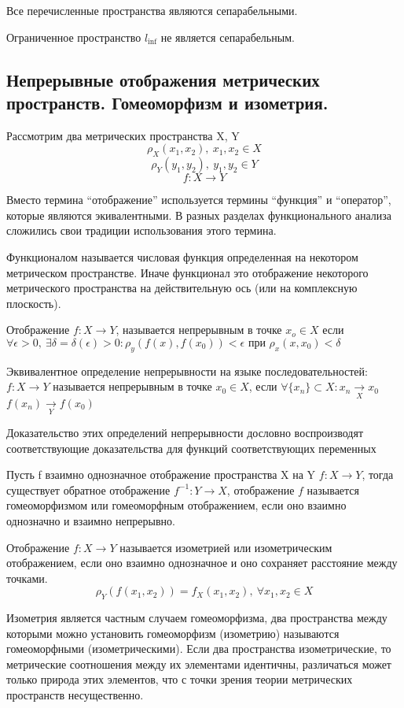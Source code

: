 \documentclass[14pt,a4paper]{extarticle}
\theoremstyle{definition}
\theoremstyle{remark}
\newcommand{\sep}{ , \ \allowbreak }
\renewcommand{\[}{\begin{dmath*}[compact]}
\renewcommand{\]}{\end{dmath*}}
\begin{document}
Все перечисленные пространства являются сепарабельными.

Ограниченное пространство $l_{\inf}$ не является сепарабельным.

\subsection{Непрерывные отображения метрических пространств.
Гомеоморфизм и изометрия.}

Рассмотрим два метрических пространства X, Y
\[\rho_X(x_1,x_2)\sep x_1,x_2\in X \]
\[\rho_Y(y_1, y_2)\sep y_1,y_2\in Y \]
\[ {f: X \to Y}\]

Вместо термина ``отображение'' используется термины ``функция'' и
``оператор'', которые являются экивалентными.
В разных разделах функционального анализа сложились свои традиции
использования этого термина.

Функционалом называется числовая функция определенная на некотором метрическом
пространстве. Иначе функционал это отображение некоторого метрического
пространства на действительную ось (или на комплексную плоскость).

Отображение $f: X \to Y$, называется непрерывным в точке $x_o \in X$ если
$ \forall \epsilon > 0 \sep \exists \delta = \delta (\epsilon) > 0:
\rho_y(f(x), f(x_0)) < \epsilon \text{ при } \rho_x(x,x_0)<\delta $

Эквивалентное определение непрерывности на языке последовательностей:
$f: X \to Y$ называется непрерывным в точке $x_0 \in X$, если
$\forall \{x_n\}\subset X: x_n\xrightarrow[X]{} x_0$
$f(x_n) \xrightarrow[Y]{} f(x_0)$

Доказательство этих определений непрерывности дословно воспроизводят
соответствующие доказательства для функций соответствующих переменных

Пусть f взаимно однозначное отображение пространства X на Y
$f: X \to Y$, тогда существует обратное отображение
$f^{-1}: Y\to X$, отображение $f$ называется гомеоморфизмом или гомеоморфным
отображением, если оно взаимно однозначно и взаимно непрерывно.

Отображение $f: X \to Y$ называется изометрией или изометрическим
отображением, если оно взаимно однозначное и оно сохраняет расстояние между
точками.
\[ \rho_Y(f(x_1,x_2))=f_X(x_1,x_2) \sep {\forall x_1,x_2\in X}\]

Изометрия является частным случаем гомеоморфизма, два пространства между
которыми можно установить гомеоморфизм (изометрию) называются гомеоморфными
(изометрическими). Если два пространства изометрические, то метрические
соотношения между их элементами идентичны, различаться может только природа
этих элементов, что с точки зрения теории метрических пространств несущественно.
\end{document}
